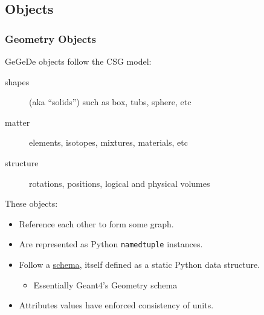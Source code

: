 \documentclass[10pt,xcolor=dvipsnames]{beamer}
\begin{document}
\subsection{Objects}

\begin{frame}
  \frametitle{Geometry Objects} 

  GeGeDe objects follow the CSG model:
  \begin{description}
  \item[shapes] (aka ``solids'') such as box, tubs, sphere, etc
  \item[matter] elements, isotopes, mixtures, materials, etc
  \item[structure] rotations, positions, logical and physical volumes
  \end{description}

  These objects:
  \begin{itemize}
  \item Reference each other to form some graph.
  \item Are represented as Python \texttt{namedtuple} instances.
  \item Follow a
    \href{https://github.com/brettviren/gegede/blob/master/python/gegede/schema/__init__.py}{schema},
    itself defined as a static Python data structure.
    \begin{itemize}\footnotesize
    \item Essentially Geant4's Geometry schema
    \end{itemize}
  \item Attributes values have enforced consistency of units.
  \end{itemize}
\end{frame}
\end{document}
